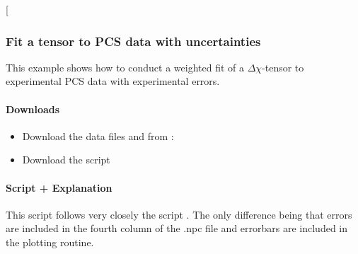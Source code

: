 \documentclass[a4paper,10pt,english]{sphinxmanual}
\begin{document}
\begin{sphinxVerbatim}[commandchars=\\\{\}]
\end{sphinxVerbatim}

 {[}\sphinxcode{\sphinxupquote{pcs\_fit\_constrained.png}}{]}

\noindent{}


\subsubsection{Fit a tensor to PCS data with uncertainties}
\label{\detokenize{examples/pcs_fit_error:fit-a-tensor-to-pcs-data-with-uncertainties}}\label{\detokenize{examples/pcs_fit_error:pcs-fit-error}}\label{\detokenize{examples/pcs_fit_error::doc}}
This example shows how to conduct a weighted fit of a \({\Delta\chi}\)-tensor to experimental PCS data with experimental errors.


\paragraph{Downloads}
\label{\detokenize{examples/pcs_fit_error:downloads}}\begin{itemize}
\item {} 
Download the data files  and  from :

\item {} 
Download the script 

\end{itemize}


\paragraph{Script + Explanation}
\label{\detokenize{examples/pcs_fit_error:script-explanation}}
This script follows very closely the script {\hyperref[\detokenize{examples/pcs_fit:pcs-fit}]{}}. The only difference being that errors are included in the fourth column of the .npc file and errorbars are included in the plotting routine.
\end{document}

